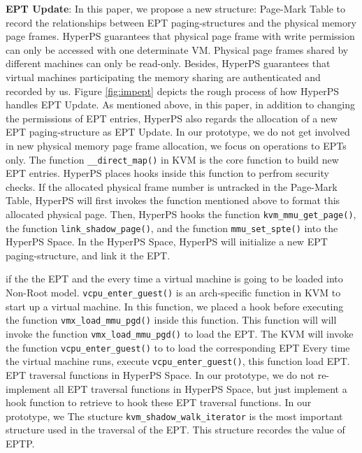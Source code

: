 \textbf{EPT Update}: 
In this paper, we propose a new structure: Page-Mark Table to record the relationships between EPT paging-structures and the physical memory page frames. 
HyperPS guarantees that physical page frame with write permission can only be accessed with one determinate VM. 
Physical page frames shared by different machines can only be read-only. 
Besides, HyperPS guarantees that virtual machines participating the memory sharing are authenticated and recorded by us. 
Figure \ref{fig:impept} depicts the rough process of how HyperPS handles EPT Update. 
As mentioned above, in this paper, in addition to changing the permissions of EPT entries, HyperPS also regards the allocation of a new EPT paging-structure as EPT Update. 
In our prototype, we do not get involved in new physical memory page frame allocation, we focus on operations to EPTs only. 
The function \verb|__direct_map()| in KVM is the core function to build new EPT entries. HyperPS places hooks inside this function to perfrom security checks. If the allocated physical frame number is untracked in the Page-Mark Table, HyperPS will first invokes the function mentioned above to format this allocated physical page. Then, HyperPS hooks the function \verb|kvm_mmu_get_page()|, the function \verb|link_shadow_page()|, and the function \verb|mmu_set_spte()| into the HyperPS Space.
In the HyperPS Space, HyperPS will initialize a new EPT paging-structure, and link it the EPT.
\fi

\iffalse
if the the EPT and the 
every time a virtual machine is going to be loaded into Non-Root model. 
\verb|vcpu_enter_guest()| is an arch-specific function in KVM to start up a virtual machine. 
In this function, we placed a hook before executing the function \verb|vmx_load_mmu_pgd()| inside this function. 
This function will will invoke the function \verb|vmx_load_mmu_pgd()| to load the EPT. 
The KVM will invoke the function \verb|vcpu_enter_guest()| to 
to load the corresponding EPT 
Every time the virtual machine runs, execute \verb|vcpu_enter_guest()|, this function load EPT.
EPT traversal functions in HyperPS Space.
In our prototype, we do not re-implement all EPT traversal functions in HyperPS Space, but just implement a hook function to retrieve
to hook these EPT traversal functions. 
In our prototype, we 
The stucture \verb|kvm_shadow_walk_iterator| is the most important structure used in the traversal of the EPT. 
This structure recordes the value of EPTP. 


